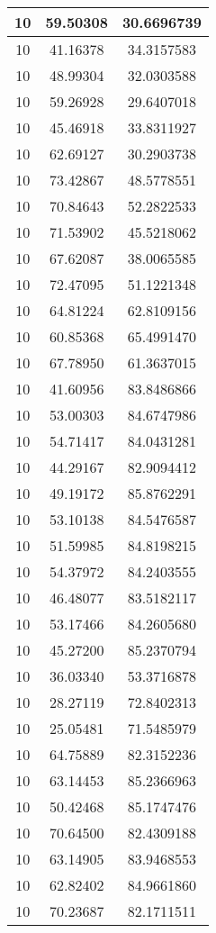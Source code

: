 \documentclass[
]{book}
\begin{document}
\begin{tabular}{c|c|c}
\hline
10 & 59.50308 & 30.6696739\\
\hline
10 & 41.16378 & 34.3157583\\
\hline
10 & 48.99304 & 32.0303588\\
\hline
10 & 59.26928 & 29.6407018\\
\hline
10 & 45.46918 & 33.8311927\\
\hline
10 & 62.69127 & 30.2903738\\
\hline
10 & 73.42867 & 48.5778551\\
\hline
10 & 70.84643 & 52.2822533\\
\hline
10 & 71.53902 & 45.5218062\\
\hline
10 & 67.62087 & 38.0065585\\
\hline
10 & 72.47095 & 51.1221348\\
\hline
10 & 64.81224 & 62.8109156\\
\hline
10 & 60.85368 & 65.4991470\\
\hline
10 & 67.78950 & 61.3637015\\
\hline
10 & 41.60956 & 83.8486866\\
\hline
10 & 53.00303 & 84.6747986\\
\hline
10 & 54.71417 & 84.0431281\\
\hline
10 & 44.29167 & 82.9094412\\
\hline
10 & 49.19172 & 85.8762291\\
\hline
10 & 53.10138 & 84.5476587\\
\hline
10 & 51.59985 & 84.8198215\\
\hline
10 & 54.37972 & 84.2403555\\
\hline
10 & 46.48077 & 83.5182117\\
\hline
10 & 53.17466 & 84.2605680\\
\hline
10 & 45.27200 & 85.2370794\\
\hline
10 & 36.03340 & 53.3716878\\
\hline
10 & 28.27119 & 72.8402313\\
\hline
10 & 25.05481 & 71.5485979\\
\hline
10 & 64.75889 & 82.3152236\\
\hline
10 & 63.14453 & 85.2366963\\
\hline
10 & 50.42468 & 85.1747476\\
\hline
10 & 70.64500 & 82.4309188\\
\hline
10 & 63.14905 & 83.9468553\\
\hline
10 & 62.82402 & 84.9661860\\
\hline
10 & 70.23687 & 82.1711511\\

\end{tabular}
\end{document}
